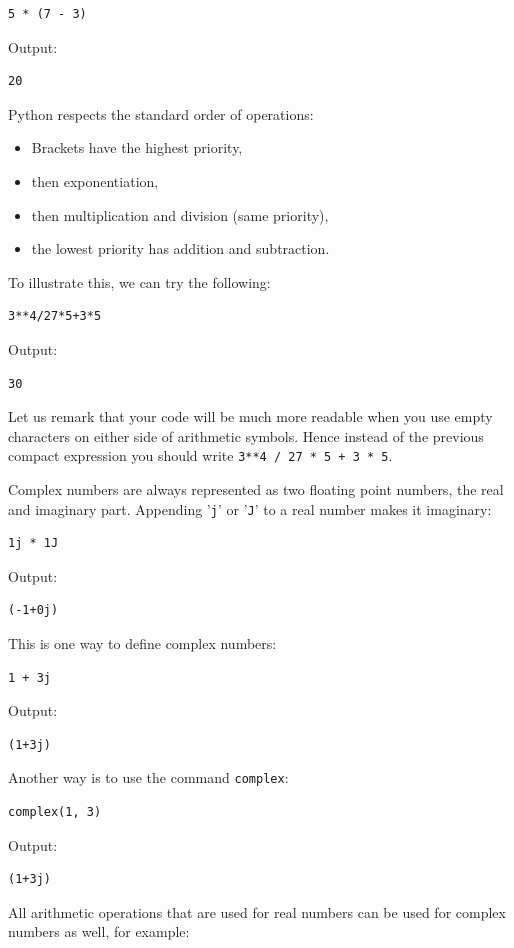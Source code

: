 \documentclass[article,A4,12pt]{llncs}
\begin{document}
\begin{verbatim}
5 * (7 - 3)
\end{verbatim}
Output:

\begin{verbatim}
20
\end{verbatim}
Python respects the standard order of operations:

\begin{itemize} 
\item Brackets have the highest priority, 
\item then exponentiation, 
\item then multiplication and division (same priority),
\item the lowest priority has addition and subtraction.
\end{itemize}
To illustrate this, we can try the following:

\begin{verbatim}
3**4/27*5+3*5
\end{verbatim}
Output:

\begin{verbatim}
30
\end{verbatim}
Let us remark that your code will be much more readable when you use empty
characters on either side of arithmetic symbols. Hence instead of the 
previous compact expression you should write {\tt 3**4 / 27 * 5 + 3 * 5}.

Complex numbers are always represented as two floating point numbers, the 
real and imaginary part. Appending '{\tt j}' or  '{\tt J}' to a real number
makes it imaginary:

\begin{verbatim}
1j * 1J
\end{verbatim}
Output:

\begin{verbatim}
(-1+0j)
\end{verbatim}
This is one way to define complex numbers:
\begin{verbatim}
1 + 3j
\end{verbatim}
Output:

\begin{verbatim}
(1+3j)
\end{verbatim}
Another way is to use the command {\tt complex}:

\begin{verbatim}
complex(1, 3)
\end{verbatim}
Output:

\begin{verbatim}
(1+3j)
\end{verbatim}
All arithmetic operations that are used for real numbers can be 
used for complex numbers as well, for example:
\end{document}
